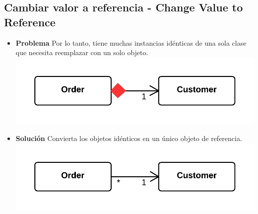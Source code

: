 \documentclass[11pt,a4paper,oneside]{book}
\begin{document}
\subsection{Cambiar valor a referencia - Change Value to Reference}
\label{changevaluetoreference}
\begin{itemize}
    \item \textbf{Problema} Por lo tanto, tiene muchas instancias idénticas de una sola clase que necesita reemplazar con un solo objeto.\\
    \centering \includegraphics[scale=0.2]{changevaluetoreferenceproblem}
    \item \textbf{Solución} Convierta los objetos idénticos en un único objeto de referencia.\\
    \centering \includegraphics[scale=0.2]{changevaluetoreferencesolution}
\end{itemize}
    
\end{document}
